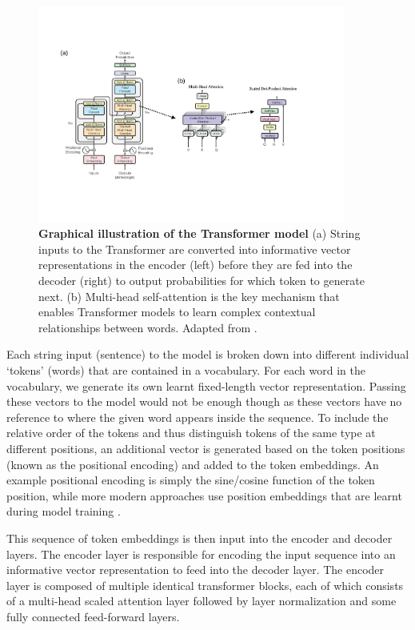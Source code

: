 \begin{figure}[ht]
\centering 
\includegraphics[width=0.9\textwidth]{Chapters/Background/Figs/transformer.pdf}
\caption{\textbf{Graphical illustration of the Transformer model} (a) String inputs to the Transformer are converted into informative vector representations in the encoder (left) before they are fed into the decoder (right) to output probabilities for which token to generate next. (b) Multi-head self-attention is the key mechanism that enables Transformer models to learn complex contextual relationships between words. Adapted from \cite{Vaswani2017}.}
\label{fig:transformer}
\end{figure}

Each string input (sentence) to the model is broken down into different individual `tokens' (words) that are contained in a vocabulary. For each word in the vocabulary, we generate its own learnt fixed-length vector representation. Passing these vectors to the model would not be enough though as these vectors have no reference to where the given word appears inside the sequence. To include the relative order of the tokens and thus distinguish tokens of the same type at different positions, an additional vector is generated based on the token positions (known as the positional encoding) and added to the token embeddings. An example positional encoding is simply the sine/cosine function of the token position, while more modern approaches use position embeddings that are learnt during model training \cite{dufter2021position}.

This sequence of token embeddings is then input into the encoder and decoder layers. The encoder layer is responsible for encoding the input sequence into an informative vector representation to feed into the decoder layer. The encoder layer is composed of multiple identical transformer blocks, each of which consists of a multi-head scaled attention layer followed by layer normalization and some fully connected feed-forward layers.

